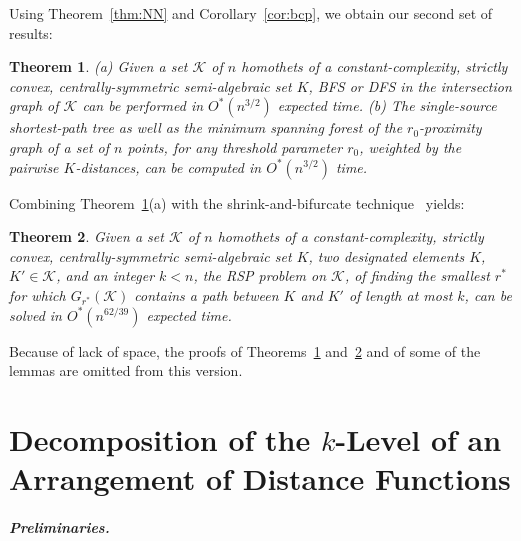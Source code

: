 \documentclass[11pt]{article}
\newif\ifsocgproc
\newif\iffullver
\def\K{\mathcal{K}}
\newtheorem{theorem}{Theorem}[section]
\theoremstyle{definition}
\begin{document}
\else
Using Theorem~\ref{thm:NN} and Corollary~\ref{cor:bcp}, we obtain our second set of results:
\fi
\begin{theorem} \label{thm:bfs}
(a) Given a set $\K$ of $n$ homothets of a constant-complexity, strictly convex, centrally-symmetric semi-algebraic set $K$,
BFS or DFS in the intersection graph of $\K$ can be performed in $O^*(n^{3/2})$ expected time. 
%
(b) The single-source shortest-path tree as well as the minimum spanning forest of the
$r_0$-proximity graph of a set of $n$ points, for any threshold parameter $r_0$, 
	weighted by the pairwise $K$-distances, can be computed in $O^*(n^{3/2})$ time.
\end{theorem}
%
Combining Theorem~\ref{thm:bfs}(a) with the shrink-and-bifurcate 
technique~\cite{BFKKS,KKSS} yields:
%

\begin{theorem} \label{thm:rsp}
Given a set $\K$ of $n$ homothets of a constant-complexity, strictly convex, centrally-symmetric semi-algebraic 
set $K$, two designated elements $K$, $K'\in \K$, and an integer $k < n$, the RSP problem on $\K$, of finding
the smallest $r^*$ for which $G_{r^*}(\K)$ contains a path between $K$ and $K'$ of length at most $k$,
can be solved in $O^*(n^{62/39})$ expected time.
\end{theorem}

\iffullver
\else
Because of lack of space, the proofs of Theorems~\ref{thm:bfs} and~\ref{thm:rsp} and of some of the lemmas are 
omitted from this version.
\fi
%
\ifsocgproc 
\section{Decomposing the $k$-Level of an Arrangement of Distance Functions} \label{sec:vd}
\else
\section{Decomposition of the $k$-Level of an Arrangement of Distance Functions} \label{sec:vd}
\fi
%
\ifsocgproc 
\subparagraph*{Preliminaries.}
\else
\end{document}
